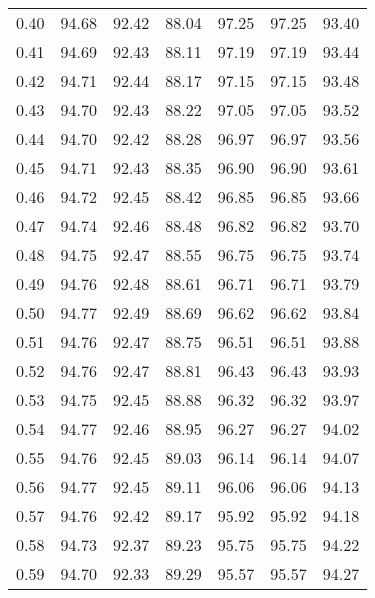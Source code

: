 \begin{tabular}{|c|c|c|c|c|c|c|}
      0.40 &     94.68 &     92.42 &      88.04 &   97.25 &      97.25 &         93.40 \\
      0.41 &     94.69 &     92.43 &      88.11 &   97.19 &      97.19 &         93.44 \\
      0.42 &     94.71 &     92.44 &      88.17 &   97.15 &      97.15 &         93.48 \\
      0.43 &     94.70 &     92.43 &      88.22 &   97.05 &      97.05 &         93.52 \\
      0.44 &     94.70 &     92.42 &      88.28 &   96.97 &      96.97 &         93.56 \\
      0.45 &     94.71 &     92.43 &      88.35 &   96.90 &      96.90 &         93.61 \\
      0.46 &     94.72 &     92.45 &      88.42 &   96.85 &      96.85 &         93.66 \\
      0.47 &     94.74 &     92.46 &      88.48 &   96.82 &      96.82 &         93.70 \\
      0.48 &     94.75 &     92.47 &      88.55 &   96.75 &      96.75 &         93.74 \\
      0.49 &     94.76 &     92.48 &      88.61 &   96.71 &      96.71 &         93.79 \\
      0.50 &     94.77 &     92.49 &      88.69 &   96.62 &      96.62 &         93.84 \\
      0.51 &     94.76 &     92.47 &      88.75 &   96.51 &      96.51 &         93.88 \\
      0.52 &     94.76 &     92.47 &      88.81 &   96.43 &      96.43 &         93.93 \\
      0.53 &     94.75 &     92.45 &      88.88 &   96.32 &      96.32 &         93.97 \\
      0.54 &     94.77 &     92.46 &      88.95 &   96.27 &      96.27 &         94.02 \\
      0.55 &     94.76 &     92.45 &      89.03 &   96.14 &      96.14 &         94.07 \\
      0.56 &     94.77 &     92.45 &      89.11 &   96.06 &      96.06 &         94.13 \\
      0.57 &     94.76 &     92.42 &      89.17 &   95.92 &      95.92 &         94.18 \\
      0.58 &     94.73 &     92.37 &      89.23 &   95.75 &      95.75 &         94.22 \\
      0.59 &     94.70 &     92.33 &      89.29 &   95.57 &      95.57 &         94.27 \\

\end{tabular}
